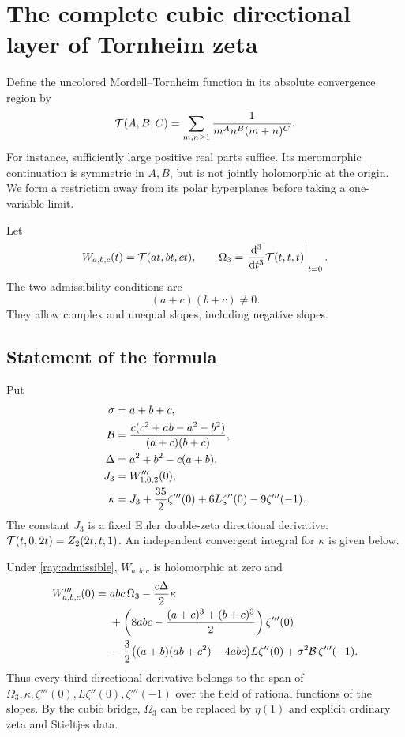 \section{The complete cubic directional layer of Tornheim zeta}
\label{sec:rays}

Define the uncolored Mordell--Tornheim function in its absolute
convergence region by
\begin{equation}\label{ray:T}
 \mathcal T(A,B,C)=\sum_{m,n\ge1}\frac1{m^A n^B(m+n)^C}.
\end{equation}
For instance, sufficiently large positive real parts suffice.
Its meromorphic continuation is symmetric in $A,B$, but is not
jointly holomorphic at the origin. We form a restriction away from
its polar hyperplanes before taking a one-variable limit.

Let
\[
 W_{a,b,c}(t)=\mathcal T(at,bt,ct),\qquad
 \Omega_3=\left.\frac{\mathrm d^3}{\mathrm dt^3}\mathcal T(t,t,t)\right|_{t=0}.
\]
The two admissibility conditions are
\begin{equation}\label{ray:admissible}
 (a+c)(b+c)\ne0.
\end{equation}
They allow complex and unequal slopes, including negative slopes.

\subsection{Statement of the formula}

Put
\begin{align}
 \sigma&=a+b+c,\notag\\
 \mathcal B&=\frac{c(c^2+ab-a^2-b^2)}{(a+c)(b+c)},\label{ray:B}\\
 \Delta&=a^2+b^2-c(a+b),\notag\\
 J_3&=W_{1,0,2}'''(0),\notag\\
 \kappa&=J_3+\frac{35}{2}\zeta'''(0)
                 +6L\zeta''(0)-9\zeta'''(-1).\label{ray:kappa}
\end{align}
The constant $J_3$ is a fixed Euler double-zeta directional derivative:
$\mathcal T(t,0,2t)=Z_2(2t,t;1)$. An independent convergent integral for
$\kappa$ is given below.

\begin{theorem}\label{thm:cubic-rays}
Under \eqref{ray:admissible}, $W_{a,b,c}$ is holomorphic at zero and
\begin{align}
 W_{a,b,c}'''(0)={}&abc\,\Omega_3-\frac{c\Delta}{2}\kappa\notag\\
 &+\left(8abc-\frac{(a+c)^3+(b+c)^3}{2}\right)\zeta'''(0)\notag\\
 &-\frac32\bigl((a+b)(ab+c^2)-4abc\bigr)L\zeta''(0)
       +\sigma^2\mathcal B\,\zeta'''(-1).
 \label{ray:main}
\end{align}
Thus every third directional derivative belongs to the span of
$\Omega_3,\kappa,\zeta'''(0),L\zeta''(0),\zeta'''(-1)$ over
the field of rational functions of the slopes. By the cubic bridge,
$\Omega_3$ can be replaced by $\eta(1)$ and explicit ordinary zeta
and Stieltjes data.
\end{theorem}

